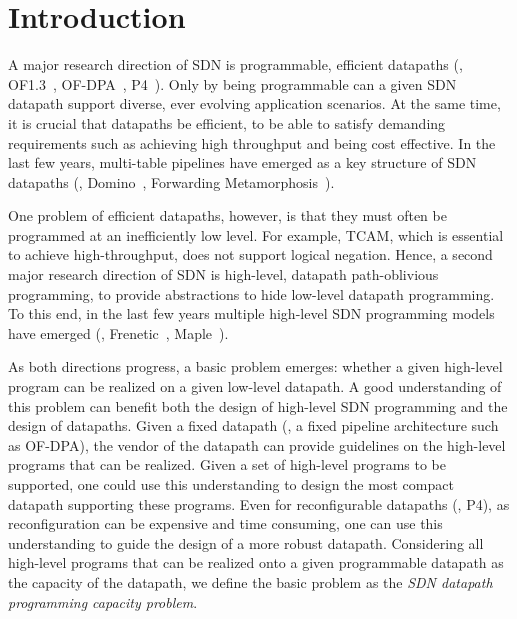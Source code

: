 \section{Introduction}\label{sec:introduction}
A major research direction of SDN is programmable, efficient datapaths (\eg, OF1.3~\cite{openflow13}, OF-DPA~\cite{OF-DPA}, P4~\cite{P4}). Only by being programmable can a given SDN datapath support diverse, ever evolving application scenarios. At the same time, it is crucial that datapaths be efficient, to be able to satisfy demanding requirements such as achieving high throughput and being cost effective. In the last few years, multi-table pipelines have emerged as a key structure of SDN datapaths (\eg, Domino~\cite{Domino}, Forwarding Metamorphosis~\cite{bosshart2013forwarding}). 


One problem of efficient datapaths, however, is that they must often be programmed at an inefficiently low level. For example, TCAM, which is essential to achieve high-throughput, does not support logical negation. Hence, a second major research direction of SDN is high-level, datapath path-oblivious programming, to provide abstractions to hide low-level datapath programming. To this end, in the last few years multiple high-level SDN programming models have emerged (\eg, Frenetic~\cite{frenetic}, Maple~\cite{maple}).

As both directions progress, a basic problem emerges: whether a given high-level program can be realized on a given low-level datapath. A good understanding of this problem can benefit both the design of high-level SDN programming and the design of datapaths. Given a fixed datapath (\eg, a fixed pipeline architecture such as OF-DPA), the vendor of the datapath can provide guidelines on the high-level programs that can be realized. Given a set of high-level programs to be supported, one could use this understanding to design the most compact datapath supporting these programs. Even for reconfigurable datapaths (\eg, P4), as reconfiguration can be expensive and time consuming, one can use this understanding to guide the design of a more robust datapath. Considering all high-level programs that can be realized onto a given programmable datapath as the capacity of the datapath, we define the basic problem as the {\em SDN datapath programming capacity problem}.


